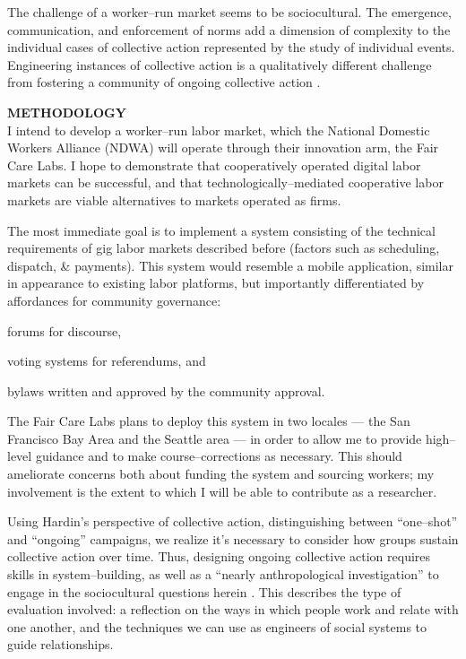 \documentclass[12pt]{article}
\newcommand{\sectitle}[1]{\textbf{\MakeUppercase{#1}}}
\begin{document}
The challenge of a worker--run market seems to be sociocultural.
The emergence, communication, and enforcement of norms
add a dimension of complexity to the individual cases of collective action represented by the study of individual events.
Engineering instances of collective action is a qualitatively different challenge from
fostering a community of ongoing collective action
\cite{russell1982collective}.

\sectitle{Methodology}\\
I intend to develop a worker--run labor market,
which the National Domestic Workers Alliance (NDWA)
will operate through their innovation arm, the Fair Care Labs.
I hope to demonstrate that cooperatively operated
digital labor markets can be successful, and that technologically--mediated
cooperative labor markets are viable alternatives to markets operated as firms.

The most immediate goal is to implement a system consisting of
the technical requirements of gig labor markets described before
(factors such as scheduling, dispatch, \& payments).
This system would resemble a mobile application,
similar in appearance to existing labor platforms,
but importantly differentiated by affordances for community governance:
\begin{inlinelist}
  \item forums for discourse,
  \item voting systems for referendums, and
  \item bylaws written and approved by the community approval.
\end{inlinelist}

The Fair Care Labs plans to deploy this system in two locales
--- the San Francisco Bay Area and the Seattle area ---
in order to allow me to provide high--level guidance
and to make course--corrections as necessary.
This should ameliorate concerns both about funding the system
and sourcing workers;
my involvement is the extent to which I will be able to contribute as a researcher.


Using Hardin's perspective of collective action,
distinguishing between ``one--shot'' and ``ongoing'' campaigns,
we realize it's necessary to consider how groups sustain collective action over time.
Thus, designing ongoing collective action requires skills in 
system--building,
as well as a ``nearly anthropological investigation'' to engage in the sociocultural questions herein
\cite{russell1982collective}.
This describes the type of evaluation involved:
a reflection on the ways in which people work and relate with one another,
and the techniques we can use as engineers of social systems to guide relationships.
\end{document}
